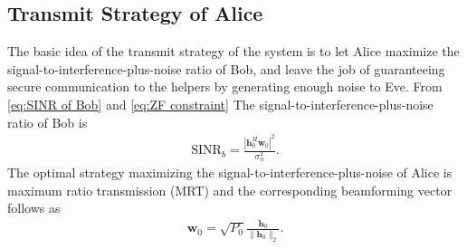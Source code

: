 \documentclass[journal]{IEEEtran}
\begin{document}

\subsection{Transmit Strategy of Alice}
The basic idea of the transmit strategy of the system is to let Alice maximize the signal-to-interference-plus-noise ratio of Bob, and leave the job of guaranteeing secure communication to the helpers by generating enough noise to Eve. From \eqref{eq:SINR of Bob} and \eqref{eq:ZF constraint} The signal-to-interference-plus-noise ratio of Bob is 
\begin{eqnarray}
\mathrm{SINR}_b= \frac{\left| \mathbf{h}_{0}^H\mathbf{w}_{0}\right|^2}{\sigma_n^2 }. 
\end{eqnarray}
The optimal strategy maximizing the signal-to-interference-plus-noise of Alice is maximum ratio transmission (MRT) and the corresponding beamforming vector follows as
\begin{eqnarray}
\mathbf{w}_0 = \sqrt{P_0}\frac{\mathbf{h}_0}{\|\mathbf{h}_0\|_2} \label{eq:optimal_w}.
\end{eqnarray}
\end{document}

